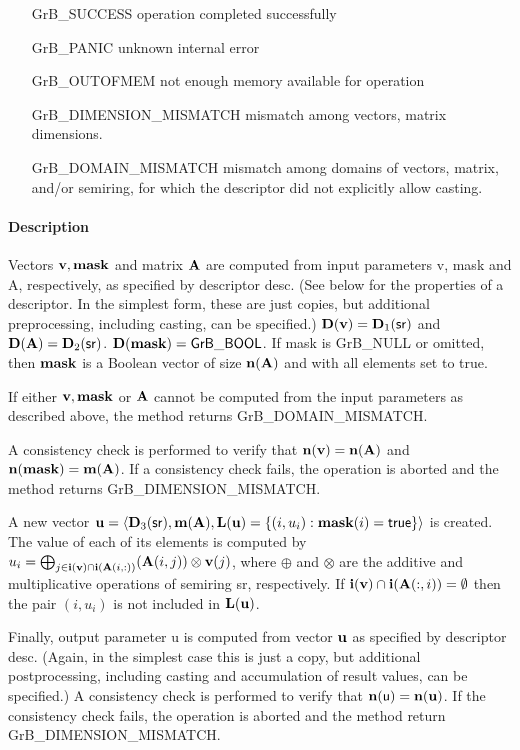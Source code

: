 \begin{itemize}[leftmargin=2.1in]
\item[{\sf GrB\_SUCCESS}]             operation completed successfully
\item[{\sf GrB\_PANIC}]               unknown internal error
\item[{\sf GrB\_OUTOFMEM}]            not enough memory available for operation
\item[{\sf GrB\_DIMENSION\_MISMATCH}] mismatch among vectors, matrix dimensions.
\item[{\sf GrB\_DOMAIN\_MISMATCH}]    mismatch among domains of vectors, matrix, and/or semiring, for which the descriptor did not explicitly allow casting.
\end{itemize}


\paragraph{Description}

Vectors ${\bf v}, {\bf mask}$ and matrix ${\bf A}$ are computed from
input parameters {\sf v}, {\sf mask} and {\sf A}, respectively, as specified
by descriptor {\sf desc}. (See below for the properties of a descriptor. In
the simplest form, these are just copies, but additional preprocessing,
including casting, can be specified.)  $\bold{D}({\bf v}) =
\bold{D}_1({\sf sr})$ and $\bold{D}({\bf A}) = \bold{D}_2({\sf sr})$.
$\bold{D}({\bf mask}) = {\sf GrB\_BOOL}$.  If {\sf mask} is {\sf GrB\_NULL} or omitted,
then ${\bf mask}$ is a Boolean vector of size $\bold{n}({\bf A})$
and with all elements set to {\sf true}.

If either ${\bf v}, {\bf mask}$ or ${\bf A}$ cannot be computed
from the input parameters as described above, the method returns {\sf
GrB\_DOMAIN\_MISMATCH}.

A consistency check is performed to verify that $\bold{n}({\bf v})
= \bold{n}({\bf A})$ and $\bold{n}({\bf mask}) =
\bold{m}({\bf A})$. If a consistency check fails, the operation is
aborted and the method returns {\sf GrB\_DIMENSION\_MISMATCH}.

A new vector ${\bf u} = \langle \bold{D}_3({\sf sr}),
\bold{m}({\bf A}), \bold{L}({\bf u}) = \{(i,u_i) : {\bf mask}(i)
= {\sf true} \} \rangle$ is created.  The value of each of its elements
is computed by $u_i = \bigoplus_{j \in {\bf i}({\bf v}) \cap
{\bf i}({\bf A}(i,:))} ({\bf A}(i,j)) \otimes {\bf v}(j)$,
where $\oplus$ and $\otimes$ are the additive and multiplicative
operations of semiring {\sf sr}, respectively.  If ${\bf i}({\bf v})
\cap {\bf i}({\bf A}(:,i)) = \emptyset$ then the pair $(i,u_i)$
is not included in $\bold{L}({\bf u})$.

Finally, output parameter {\sf u} is computed from vector ${\bf u}$
as specified by descriptor {\sf desc}. (Again, in the simplest case this
is just a copy, but additional postprocessing, including casting and
accumulation of result values, can be specified.)  A consistency check is
performed to verify that $\bold{n}({\sf u}) = \bold{n}({\bf u})$. If
the consistency check fails, the operation is aborted and the method
return {\sf GrB\_DIMENSION\_MISMATCH}.
